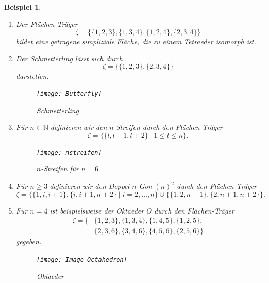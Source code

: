 \documentclass[12pt,titlepage,twoside,cleardoublepage]{article}
\theoremstyle{nummermitklammern}
\newtheorem{bsp}[temp]{Beispiel}
\newtheorem{definition}[temp]{Definition}
\newtheorem{definition}[zahl]{Definition}
\newtheorem{bsp}[zahl]{Beispiel}
\numberwithin{equation}{section}
\begin{document}
\begin{bsp} \label{bspO}

\begin{enumerate}
\item Der Flächen-Träger 
\[
\zeta=\{\{1,2,3\},\{1,3,4\},\{1,2,4\},\{2,3,4\}\}
\]
bildet eine getragene simpliziale Fläche, die zu einem Tetraeder isomorph ist.
\item Der Schmetterling lässt sich durch 
\[
\zeta =\{\{1,2,3\},\{2,3,4\}\}
\] darstellen.
\begin{figure}[H]
\begin{center}
\texttt{[image: Butterfly]}
\end{center}
\caption{Schmetterling}
\end{figure}
\item
Für $n\in \mathbb{N}$ definieren wir den \emph{$n$-Streifen} durch den Flächen-Träger
\[
\zeta=\{\{l,l+1,l+2\}\mid 1\leq l \leq n\}.
\]
\begin{figure}[H]
\begin{center}
\texttt{[image: nstreifen]}
\end{center}
\caption{ $n$-Streifen für $n=6$}
\end{figure}
\item 
Für $n\geq 3$ definieren wir den Doppel-$n$-Gon $(n)^2$ durch den Flächen-Träger  
\[
\zeta=\{\{1,i,i+1\},\{i,i+1,n+2\}\mid i=2,\ldots, n\}\cup \{\{1,2,n+1\},\{2,n+1,n+2\}\}.
\]  
\item
Für $n=4$ ist beispielsweise der Oktaeder $O$ durch den  Flächen-Träger
\begin{align*}
\zeta=\{&\{1,2,3\},\{1,3,4\},\{1,4,5\},\{1,2,5\},\\
&\{2,3,6\},\{3,4,6\},\{4,5,6\},\{2,5,6\}\}
\end{align*} 
gegeben.
\begin{figure}[H]
\begin{center}
\texttt{[image: Image\_Octahedron]}
\end{center}
\caption{Oktaeder}
\end{figure} 
\end{enumerate}
\end{bsp}

\end{document}
